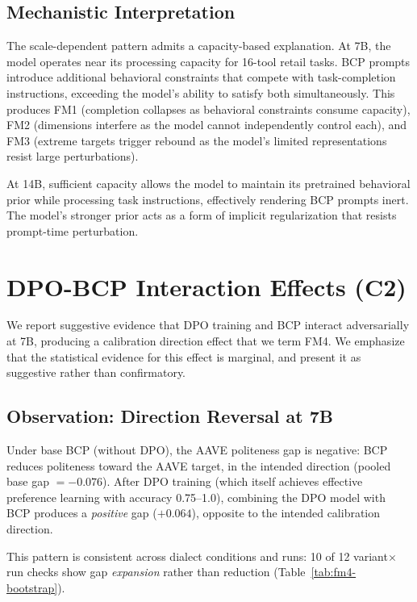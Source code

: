 \documentclass[11pt,a4paper]{article}
\begin{document}
\subsection{Mechanistic Interpretation}

The scale-dependent pattern admits a capacity-based explanation. At 7B, the model operates near its processing capacity for 16-tool retail tasks. BCP prompts introduce additional behavioral constraints that compete with task-completion instructions, exceeding the model's ability to satisfy both simultaneously. This produces FM1 (completion collapses as behavioral constraints consume capacity), FM2 (dimensions interfere as the model cannot independently control each), and FM3 (extreme targets trigger rebound as the model's limited representations resist large perturbations).

At 14B, sufficient capacity allows the model to maintain its pretrained behavioral prior while processing task instructions, effectively rendering BCP prompts inert. The model's stronger prior acts as a form of implicit regularization that resists prompt-time perturbation.

\section{DPO-BCP Interaction Effects (C2)}
\label{sec:c2}

We report suggestive evidence that DPO training and BCP interact adversarially at 7B, producing a calibration direction effect that we term FM4. We emphasize that the statistical evidence for this effect is marginal, and present it as suggestive rather than confirmatory.

\subsection{Observation: Direction Reversal at 7B}

Under base BCP (without DPO), the AAVE politeness gap is negative: BCP reduces politeness toward the AAVE target, in the intended direction (pooled base gap $= -0.076$). After DPO training (which itself achieves effective preference learning with accuracy 0.75--1.0), combining the DPO model with BCP produces a \emph{positive} gap ($+0.064$), opposite to the intended calibration direction.

This pattern is consistent across dialect conditions and runs: 10 of 12 variant$\times$run checks show gap \emph{expansion} rather than reduction (Table~\ref{tab:fm4-bootstrap}).
\end{document}
